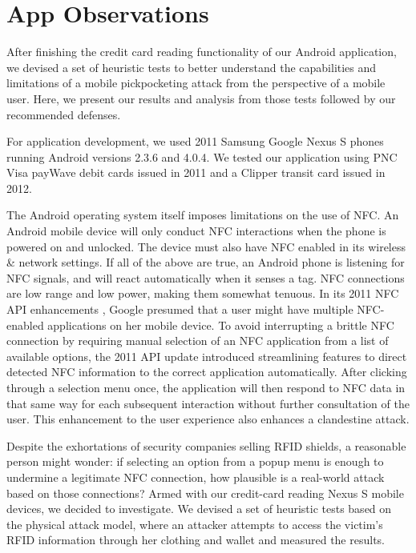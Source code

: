 \documentclass{IEEEtran}
\begin{document}
\section{App Observations}
After finishing the credit card reading functionality of our Android application, we devised a set of heuristic tests to better understand the capabilities and limitations of a mobile pickpocketing attack from the perspective of a mobile user.  Here, we present our results and analysis from those tests followed by our recommended defenses.  

For application development, we used 2011 Samsung Google Nexus S phones running Android versions 2.3.6 and 4.0.4.  We tested our application using PNC Visa payWave debit cards issued in 2011 and a Clipper transit card issued in 2012.

The Android operating system itself imposes limitations on the use of NFC.  An Android mobile device will only conduct NFC interactions when the phone is powered on and unlocked.  The device must also have NFC enabled in its wireless 
\& network settings.  If all of the above are true, an Android phone is listening for NFC signals, and will react automatically when it senses a tag.  NFC connections are low range and low power, making them somewhat tenuous.  In its 2011 NFC API enhancements \cite{android-developers-nfc-basics}, Google presumed that a user might have multiple NFC-enabled applications on her mobile device.  To avoid interrupting a brittle NFC connection by requiring manual selection of an NFC application from a list of available options, the 2011 API update introduced streamlining features to direct detected NFC information to the correct application automatically.  After clicking through a selection menu once, the application will then respond to NFC data in that same way for each subsequent interaction without further consultation of the user.  This enhancement to the user experience also enhances a clandestine attack.

Despite the exhortations of security companies selling RFID shields, a reasonable person might wonder:  if selecting an option from a popup menu is enough to undermine a legitimate NFC connection, how plausible is a real-world attack based on those connections?  Armed with our credit-card reading Nexus S mobile devices, we decided to investigate.  We devised a set of heuristic tests based on the physical attack model, where an attacker attempts to access the victim's RFID information through her clothing and wallet and measured the results.  
\end{document}
